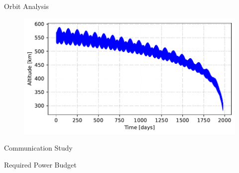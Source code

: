 \begin{frame}{Orbit Analysis}

    \begin{figure}[!ht]
        \begin{center}
            \includegraphics[width=0.8\columnwidth]{figures/lifetime}
        \end{center}
    \end{figure}

\end{frame}

\begin{frame}{Communication Study}

\end{frame}

\begin{frame}{Required Power Budget}

\end{frame}

